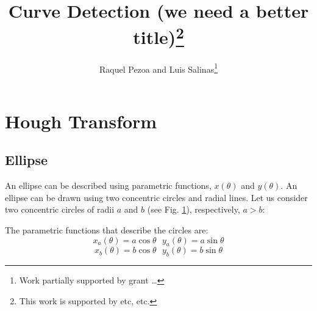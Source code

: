 \documentclass{ws-procs9x6}
\begin{document}
\title{Curve Detection (we need a better title)\footnote{\uppercase{T}his work is supported by etc, etc.}}

\author{Raquel Pezoa and Luis Salinas\footnote{\uppercase{W}ork partially
supported by grant \ldots}}

\address{Universidad T\'ecnica Federico Santa Mar\'ia, \\
Avenida Espa\~na 1680, \\ 
Valpara\'iso, Chile\\ 
E-mail: rpezoa,lsalinas@usm.cl}



\maketitle


\section{Hough Transform}

\subsection{Ellipse}
An ellipse can be described using parametric functions, $x(\theta)$ and
$y(\theta)$.
An ellipse can be drawn using two concentric circles and radial
lines. Let us consider two concentric circles of radii $a$ and $b$ (see Fig. \ref{fig:circles1}), respectively, $a > b$:

\begin{figure}[h!t!pb]
\centering
{}
\caption{}
\label{fig:circles1}
\end{figure}

The parametric functions that describe the circles are: 
$$x_{a}(\theta) = a \cos\theta \ \ \ y_{a}(\theta)= a \sin\theta$$
$$x_{b}(\theta) = b \cos\theta \ \ \ y_{b}(\theta)= b \sin\theta$$ 
\end{document}
